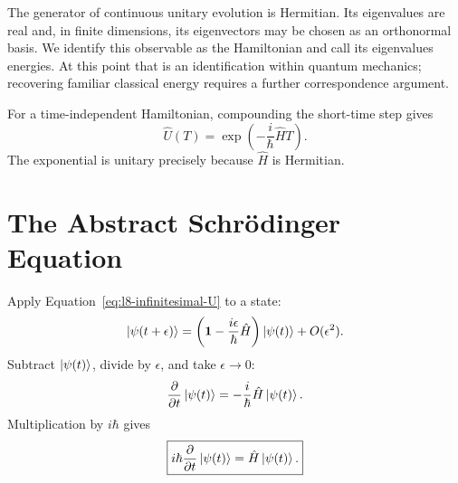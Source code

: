 The generator of continuous unitary evolution is Hermitian. Its eigenvalues
are real and, in finite dimensions, its eigenvectors may be chosen as an
orthonormal basis. We identify this observable as the Hamiltonian and call its
eigenvalues energies. At this point that is an identification within quantum
mechanics; recovering familiar classical energy requires a further
correspondence argument.

For a time-independent Hamiltonian, compounding the short-time step gives
\begin{equation}
  \hat U(T)
  =
  \exp\left(-\frac{i}{\hbar}\hat H T\right).
  \label{eq:l8-exponential-U}
\end{equation}
The exponential is unitary precisely because \(\hat H\) is Hermitian.

\begin{classroomqa}
\end{classroomqa}

\section{The Abstract Schr\"odinger Equation}

Apply Equation~\eqref{eq:l8-infinitesimal-U} to a state:
\begin{equation}
  \left\lvert\psi(t+\epsilon)\right\rangle
  =
  \left(
    \mathbf1-\frac{i\epsilon}{\hbar}\hat H
  \right)
  \left\lvert\psi(t)\right\rangle
  +O(\epsilon^2).
  \label{eq:l8-small-state-step}
\end{equation}
Subtract \(\left\lvert\psi(t)\right\rangle\), divide by \(\epsilon\), and take
\(\epsilon\to0\):
\begin{equation}
  \frac{\partial}{\partial t}\left\lvert\psi(t)\right\rangle
  =
  -\frac{i}{\hbar}\hat H\left\lvert\psi(t)\right\rangle.
\end{equation}
Multiplication by \(i\hbar\) gives
\begin{equation}
  \boxed{
  i\hbar\frac{\partial}{\partial t}\left\lvert\psi(t)\right\rangle
  =
  \hat H\left\lvert\psi(t)\right\rangle.}
  \label{eq:l8-abstract-Schrodinger}
\end{equation}


